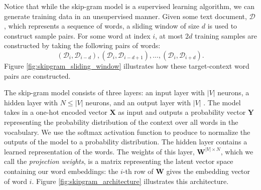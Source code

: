 \documentclass{paper}
\let\vec\mathbf
\newcommand{\mat}[1]{\bm{#1}}
\begin{document}
Notice that while the skip-gram model is a supervised learning algorithm, we can generate training data in an unsupervised manner. Given some text document, $\mathcal{D}$, which represents a sequence of words, a sliding window of size $d$ is used to construct sample pairs. For some word at index $i$, at most $2d$ training samples are constructed by taking the following pairs of words:
\begin{equation*}
    (\mathcal{D}_{i}, \mathcal{D}_{i-d}), (\mathcal{D}_{i}, \mathcal{D}_{i-d+1}),\ldots, (\mathcal{D}_{i}, \mathcal{D}_{i+d}).
\end{equation*}
Figure \ref{fig:skipgram_sliding_window} illustrates how these target-context word pairs are constructed. 

The skip-gram model consists of three layers: an input layer with $|V|$ neurons, a hidden layer with $N\leq|V|$ neurons, and an output layer with $|V|$ \cite{mikolov2013efficient}. The model takes in a one-hot encoded vector $\vec{X}$ as input and outputs a probability vector $\vec{Y}$ representing the probability distribution of the context over all words in the vocabulary. We use the softmax activation function to produce to normalize the outputs of the model to a probability distribution. The hidden layer contains a learned representation of the words. The weights of this layer, $\mat{W}^{|V|\times N}$, which we call the \textit{projection weights}, is a matrix representing the latent vector space containing our word embeddings: the $i$-th row of $\mat{W}$ gives the embedding vector of word $i$. Figure \ref{fig:skipgram_architecture} illustrates this architecture.
\end{document}
